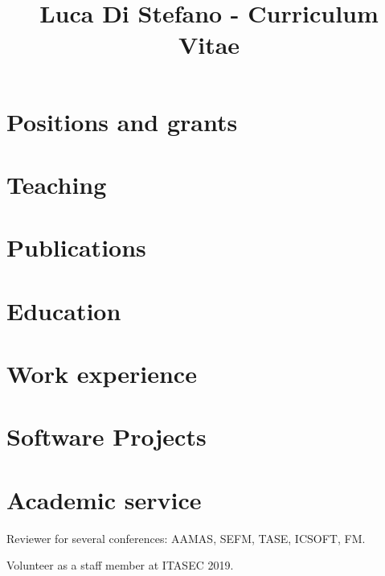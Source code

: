 \documentclass[a4paper, 12pt]{comcv}
\title{Luca Di Stefano - Curriculum Vitae}
\begin{document}
\section{Positions and grants}


\section{Teaching}


\section{Publications}
\nocite{*}




\section{Education}


\section{Work experience}


\section{Software Projects}
\vspace{1.1\topsep}


\section{Academic service}
\vspace{1.1\topsep}
\begin{tightemize}
    \item Reviewer for several conferences: AAMAS\@, SEFM\@, TASE\@, ICSOFT\@, FM\@.
    \item Volunteer as a staff member at ITASEC 2019.
\end{tightemize}
\end{document}
